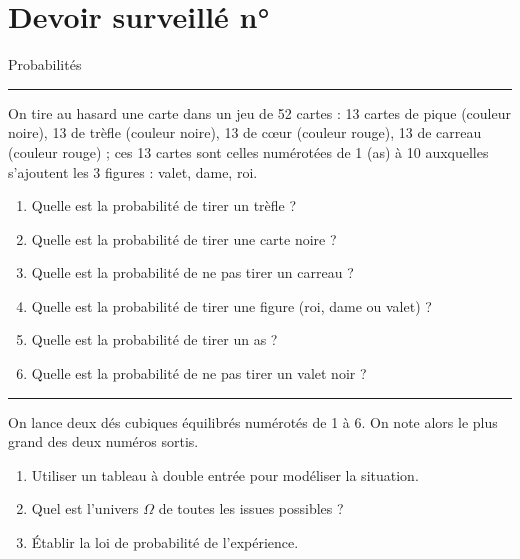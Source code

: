 \cleardoublepage

\fancyhead{} %

		\fancyfoot{}

\setcounter{ds}{7} %
\setcounter{chaptertemp}{\thechapter} %
\setcounter{chapter}{\theds} %
		
    
\section*{Devoir surveill\'e n°\theds}\label{DS7}
{\centering \large Probabilit\'es}

\medskip

\hrule

\begin{exo}\label{ds7exo1}
On tire au hasard une carte dans un jeu de 52 cartes : 13 cartes de pique (couleur noire), 13 de tr\`efle (couleur noire), 13 de c\oe{}ur (couleur rouge), 13 de carreau (couleur rouge) ; ces 13 cartes sont celles num\'erot\'ees de 1 (as) \`a 10 auxquelles s'ajoutent les 3 figures : valet, dame, roi.
\begin{enumerate}
 \item Quelle est la probabilit\'e de tirer un tr\`efle ?
 \item Quelle est la probabilit\'e de tirer une carte noire ?
 \item Quelle est la probabilit\'e de ne pas tirer un carreau ?
 \item Quelle est la probabilit\'e de tirer une figure (roi, dame ou valet) ?
 \item Quelle est la probabilit\'e de tirer un as ?
 \item Quelle est la probabilit\'e de ne pas tirer un valet noir ?
\end{enumerate}
\end{exo}

\hrule

\begin{exo}
On lance deux d\'es cubiques \'equilibr\'es num\'erot\'es de 1 \`a 6. On note alors le plus grand des deux num\'eros sortis.
\begin{enumerate}
 \item Utiliser un tableau \`a double entr\'ee pour mod\'eliser la situation.
 \item Quel est l'univers $\Omega$ de toutes les issues possibles ?
 \item \'Etablir la loi de probabilit\'e de l'exp\'erience.
\end{enumerate}

\end{exo}

